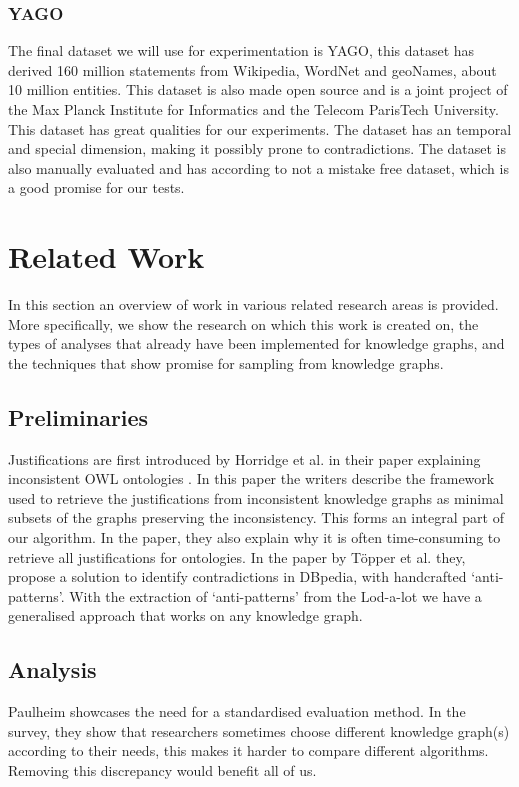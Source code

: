 \documentclass{article}
\begin{document}
\subsubsection{YAGO}
The final dataset we will use for experimentation is YAGO\cite{YAGO2:2013}, this dataset has derived 160 million statements from Wikipedia, WordNet and geoNames, about 10 million entities. This dataset is also made open source and is a joint project of the Max Planck Institute for Informatics and the Telecom ParisTech University. This dataset has great qualities for our experiments. The dataset has an temporal and special dimension, making it possibly prone to contradictions. The dataset is also manually evaluated and has according to \cite{YAGO2:2013} not a mistake free dataset, which is a good promise for our tests.

\newpage
\section{Related Work}
In this section an overview of work in various related research areas is provided. More specifically, we show the research on which this work is created on, the types of analyses that already have been implemented for knowledge graphs, and the techniques that show promise for sampling from knowledge graphs. \\

\subsection{Preliminaries}
Justifications are first introduced by Horridge et al. in their paper explaining inconsistent OWL ontologies \cite{Horridge:2009}. In this paper the writers describe the framework used to retrieve the justifications from inconsistent knowledge graphs as minimal subsets of the graphs preserving the inconsistency. This forms an integral part of our algorithm. In the paper, they also explain why it is often time-consuming to retrieve all justifications for ontologies. In the paper by T\"{o}pper et al. \cite{Topper:2012} they, propose a solution to identify contradictions in DBpedia, with handcrafted `anti-patterns'. With the extraction of `anti-patterns' from the Lod-a-lot we have a generalised approach that works on any knowledge graph. \\

\subsection{Analysis}
Paulheim \cite{HeikoP:2016} showcases the need for a standardised evaluation method. In the survey, they show that researchers sometimes choose different knowledge graph(s) according to their needs, this makes it harder to compare different algorithms. Removing this discrepancy would benefit all of us.\\ 
\end{document}
